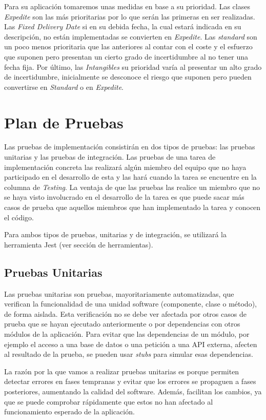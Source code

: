 Para su aplicación tomaremos unas medidas en base a su prioridad. Las clases \textit{Expedite} son las más prioritarias por lo que serán las primeras en ser realizadas. Las \textit{Fixed Delivery Date} si en su debida fecha, la cual estará indicada en su descripción, no están implementadas se convierten en \textit{Expedite}. Las \textit{standard} son un poco menos prioritaria que las anteriores al contar con el coste y el esfuerzo que suponen pero presentan un cierto grado de incertidumbre al no tener una fecha fija. Por último, las \textit{Intangibles} su prioridad varía al presentar un alto grado de incertidumbre, inicialmente se desconoce el riesgo que suponen pero pueden convertirse en \textit{Standard} o en \textit{Expedite}.

\section{Plan de Pruebas}
\label{cap:pruebas}
\nocite{pipelineRedHat}
\nocite{testingSW}
\nocite{ciAmazon}

Las pruebas de implementación consistirán en dos tipos de pruebas: las pruebas unitarias y las pruebas de integración. Las pruebas de una tarea de implementación concreta las realizará algún miembro del equipo que no haya participado en el desarrollo de esta y las hará cuando la tarea se encuentre en la columna de \textit{Testing}. La ventaja de que las pruebas las realice un miembro que no se haya visto involucrado en el desarrollo de la tarea es que puede sacar más casos de prueba que aquellos miembros que han implementado la tarea y conocen el código.

Para ambos tipos de pruebas, unitarias y de integración, se utilizará la herramienta Jest (ver sección de herramientas).
\subsection{Pruebas Unitarias}
Las pruebas unitarias son pruebas, mayoritariamente automatizadas, que verifican la funcionalidad de una unidad software (componente, clase o método), de forma aislada. Esta verificación no se debe ver afectada por otros casos de prueba que se hayan ejecutado anteriormente o por dependencias con otros módulos de la aplicación. Para evitar que las dependencias de un módulo, por ejemplo el acceso a una base de datos o una petición a una API externa, afecten al resultado de la prueba, se pueden usar \textit{stubs} para simular esas dependencias.

La razón por la que vamos a realizar pruebas unitarias es porque permiten detectar errores en fases tempranas y evitar que los errores se propaguen a fases posteriores, aumentando la calidad del software. Además, facilitan los cambios, ya que se puede comprobar rápidamente que estos no han afectado al funcionamiento esperado de la aplicación.

